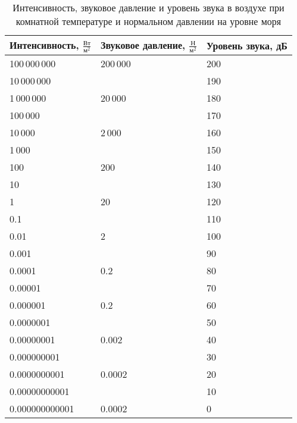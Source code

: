 \begin{table}[H]
\centering
\caption{Интенсивность, звуковое давление и уровень звука в воздухе при комнатной температуре и нормальном давлении на уровне моря}
\vspace{0.5em}
\begin{tabular}{lll}
\toprule
Интенсивность, $\frac{\text{Вт}}{\text{м}^2}$ & Звуковое давление, $\frac{\text{Н}}{\text{м}^2}$ & Уровень звука, дБ \\ \midrule
		   100\,000\,000 & 200\,000 & 200 \\
\hphantom{0}10\,000\,000 &  & 190 \\
\hphantom{00}1\,000\,000 & \hphantom{0}20\,000 & 180 \\
\hphantom{000\,}100\,000 & & 170 \\
\hphantom{0000\,}10\,000 & \hphantom{00}2\,000& 160 \\
\hphantom{00000\,}1\,000 & & 150 \\
\hphantom{000000\,\,}100 &  \hphantom{000\,}200 & 140 \\
\hphantom{0000000\,\,}10 & & 130 \\
\hphantom{00000000\,\,}1 & \hphantom{0000\,}20 & 120 \\
\hphantom{00000000\,\,}0.1	&  &  110\\
\hphantom{00000000\,\,}0.01	& \hphantom{00000\,}2 &  100\\
\hphantom{00000000\,\,}0.001	&  &  90\\
\hphantom{00000000\,\,}0.0001	& \hphantom{00000\,}0.2 &  80\\
\hphantom{00000000\,\,}0.00001	&  &  70\\
\hphantom{00000000\,\,}0.000001	& \hphantom{00000\,}0.2 &  60\\
\hphantom{00000000\,\,}0.0000001	&  &  50\\
\hphantom{00000000\,\,}0.00000001	& \hphantom{00000\,}0.002 &  40\\
\hphantom{00000000\,\,}0.000000001	&  &  30\\
\hphantom{00000000\,\,}0.0000000001	& \hphantom{00000\,}0.0002 &  20\\
\hphantom{00000000\,\,}0.00000000001	&  &  10\\
\hphantom{00000000\,\,}0.000000000001	& \hphantom{00000\,}0.0002 &  0\\\bottomrule
\end{tabular}
\end{table}



